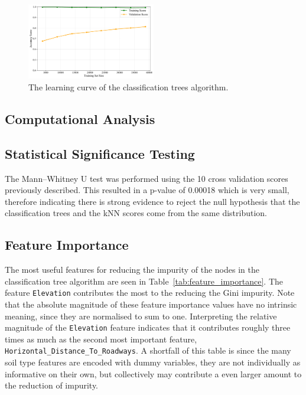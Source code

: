 \documentclass[10pt, conference]{IEEEtran}
\begin{document}
\begin{figure}[htbp]
	\centering
	\includegraphics[width=0.5\textwidth]{../plots/dt_learning_curve.pdf}
	\caption{The learning curve of the classification trees algorithm.}
	\label{fig:dt-learning}
\end{figure}


\subsection{Computational Analysis}

\subsection{Statistical Significance Testing}
The Mann–Whitney U test \cite{mann1947test} was performed using the 10 cross validation scores previously described. This resulted in a p-value of 0.00018 which is very small, therefore indicating there is strong evidence to reject the null hypothesis that the classification trees and the kNN scores come from the same distribution.

\subsection{Feature Importance}
The most useful features for reducing the impurity of the nodes in the classification tree algorithm are seen in Table~\ref{tab:feature_importance}. The feature \texttt{Elevation} contributes the most to the reducing the Gini impurity. Note that the absolute magnitude of these feature importance values have no intrinsic meaning, since they are normalised to sum to one. Interpreting the relative magnitude of the \texttt{Elevation} feature indicates that it contributes roughly three times as much as the second most important feature, \texttt{Horizontal\_Distance\_To\_Roadways}. A shortfall of this table is since the many soil type features are encoded with dummy variables, they are not individually as informative on their own, but collectively may contribute a even larger amount to the reduction of impurity. 
\end{document}

